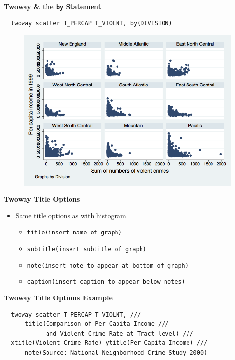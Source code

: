 \documentclass[]{book}
\providecommand{\tightlist}{%
  \setlength{\itemsep}{0pt}\setlength{\parskip}{0pt}}
\begin{document}
\textbf{Twoway \& the \texttt{by} Statement}

\begin{verbatim}
  twoway scatter T_PERCAP T_VIOLNT, by(DIVISION)
\end{verbatim}

\begin{figure}
\centering
\includegraphics{Stata/StataModGraph/images/twowayby.png}
\caption{}
\end{figure}

\textbf{Twoway Title Options}

\begin{itemize}
\tightlist
\item
  Same title options as with histogram

  \begin{itemize}
  \tightlist
  \item
    \texttt{title(insert\ name\ of\ graph)}
  \item
    \texttt{subtitle(insert\ subtitle\ of\ graph)}
  \item
    \texttt{note(insert\ note\ to\ appear\ at\ bottom\ of\ graph)}
  \item
    \texttt{caption(insert\ caption\ to\ appear\ below\ notes)}
  \end{itemize}
\end{itemize}

\textbf{Twoway Title Options Example}

\begin{verbatim}
  twoway scatter T_PERCAP T_VIOLNT, ///
      title(Comparison of Per Capita Income ///
            and Violent Crime Rate at Tract level) ///
  xtitle(Violent Crime Rate) ytitle(Per Capita Income) ///
      note(Source: National Neighborhood Crime Study 2000) 
\end{verbatim}
\end{document}
